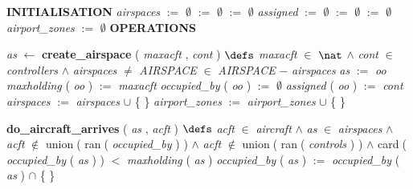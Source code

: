 \bresetindent
%
%
\vspace{-4.5ex}\bsetindent
\begin{tabbing}
\bSetTabs
\+\> \-
%
%
\bbnl
{\bf INITIALISATION} \+ \bbnl
{\em airspaces\/} $:=$   $\emptyset$   $:=$   $\emptyset$   $:=$   $\emptyset$  \bparallel \bnl
{\em assigned\/} $:=$   $\emptyset$   $:=$   $\emptyset$   $:=$   $\emptyset$  \bparallel \bnl
{\em airport\_zones\/} $:=$   $\emptyset$  \-
%
%
\bnl\bnl
{\bf OPERATIONS} \+ \bbnl

%
%
{\em as\/} $\longleftarrow$  {\bf { create\_airspace}} ( {\em maxacft\/} , {\em cont\/} ) \bhsp $\defs$ \+ \bnl
  \+\bnl
{\em maxacft\/} $\in$  $\nat$  $\wedge$ \bnl
{\em cont\/} $\in$ {\em controllers\/}\label{controllers}  $\wedge$ \bnl
{\em airspaces\/} $\neq$ {\em AIRSPACE\/} \-\bnl
{} \+\bnl
{}  \-\bnl
{}  $\in$ {\em AIRSPACE\/} $-$ {\em airspaces\/} \-\bnl
{} \+\bnl
{\em as\/} $:=$  {\em oo\/} \bparallel \bnl
{\em maxholding\/} ( {\em oo\/} )  $:=$  {\em maxacft\/} \bparallel \bnl
{\em occupied\_by\/} ( {\em oo\/} )  $:=$   $\emptyset$  \bparallel \bnl
{\em assigned\/} ( {\em oo\/} )  $:=$  {\em cont\/} \bparallel \bnl
{\em airspaces\/} $:=$  {\em airspaces\/} $\cup$  \{  \- \}  \bparallel \bnl
{\em airport\_zones\/} $:=$  {\em airport\_zones\/} $\cup$  \{  \- \}  \-\bnl
{}  \-\bnl
{}  \- \bOperationSemiColon 
\end{tabbing}
\bresetindent
%
%
\vspace{-4.5ex}\bsetindent
\begin{tabbing}
\bSetTabs
\+\>
%
%
{\bf { do\_aircraft\_arrives}} ( {\em as\/} , {\em acft\/} ) \bhsp $\defs$ \+ \bnl
  \+\bnl
{\em acft\/} $\in$ {\em aircraft\/}\label{aircraft}  $\wedge$ \bnl
{\em as\/} $\in$ {\em airspaces\/} $\wedge$ \bnl
{\em acft\/} $\not\in$  {\sf union}$\;$(  {\sf ran}$\;$( {\em occupied\_by\/} )  )  $\wedge$ \bnl
{\em acft\/} $\not\in$  {\sf union}$\;$(  {\sf ran}$\;$( {\em controls\/}\label{controls}  )  )  $\wedge$ \bnl
{\sf card}$\;$( {\em occupied\_by\/} ( {\em as\/} )  )  $<$ {\em maxholding\/} ( {\em as\/} )  \-\bnl
{} \+\bnl
{\em occupied\_by\/} ( {\em as\/} )  $:=$  {\em occupied\_by\/} ( {\em as\/} )  $\cap$  \{  \- \}  \-\bnl
{}  \- \bOperationSemiColon 
\end{tabbing}
